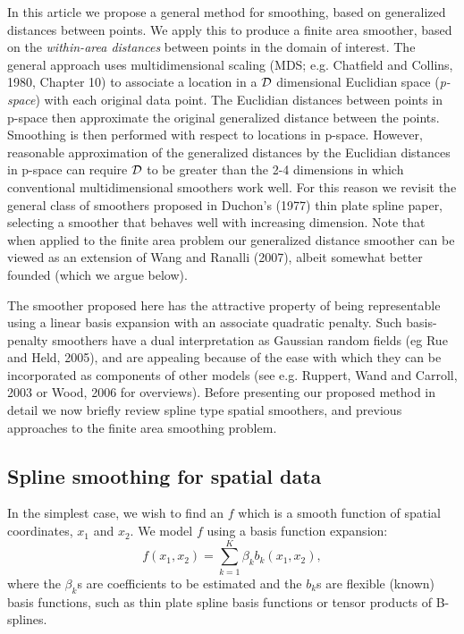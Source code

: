 \documentclass[useAMS, referee]{biom}
\begin{document}
In this article we propose a general method for smoothing, based on generalized distances between points. We apply this to produce a finite area smoother, based on the \textit{within-area distances} between points in the domain of interest. The general approach uses multidimensional scaling (MDS; e.g. Chatfield and Collins, 1980, Chapter 10) to associate a location in a $\cal D$ dimensional Euclidian space ({\em p-space}) with each original data point. The Euclidian distances between points in p-space then approximate the original generalized distance between the points. Smoothing is then performed with respect to locations in p-space. However, reasonable approximation of the generalized distances by the Euclidian distances in p-space can require $\cal D$ to be greater than the 2-4 dimensions in which conventional multidimensional smoothers work well. For this reason we revisit the general class of smoothers proposed in Duchon's (1977) thin plate spline paper, selecting a smoother that behaves well with increasing dimension. Note that when applied to the finite area problem our generalized distance smoother can be viewed as an  extension of Wang and Ranalli (2007), albeit somewhat better founded (which we argue below).

The smoother proposed here has the attractive property of being representable using a linear basis expansion with an associate quadratic penalty. Such basis-penalty smoothers have a dual interpretation as Gaussian random fields (eg Rue and Held, 2005), and are appealing because of the ease with which they can be incorporated as components of other models  
(see e.g. Ruppert, Wand and Carroll, 2003 or Wood, 2006 for overviews). Before presenting our proposed method in detail we now briefly review spline type spatial smoothers, and previous approaches to the finite area smoothing problem.

\subsection{Spline smoothing for spatial data}

In the simplest case, we wish to find an $f$ which is a smooth function of spatial coordinates, $x_1$ and $x_2$. We model $f$ using a basis function expansion:
\begin{equation}
f(x_{1}, x_{2}) = \sum_{k=1}^K \beta_k b_k(x_{1}, x_{2}),
\label{basis-exp}
\end{equation}
where the $\beta_k$s are coefficients to be estimated and the $b_k$s are flexible (known) basis functions, such as thin plate spline basis functions or tensor products of B-splines. 
\end{document}
